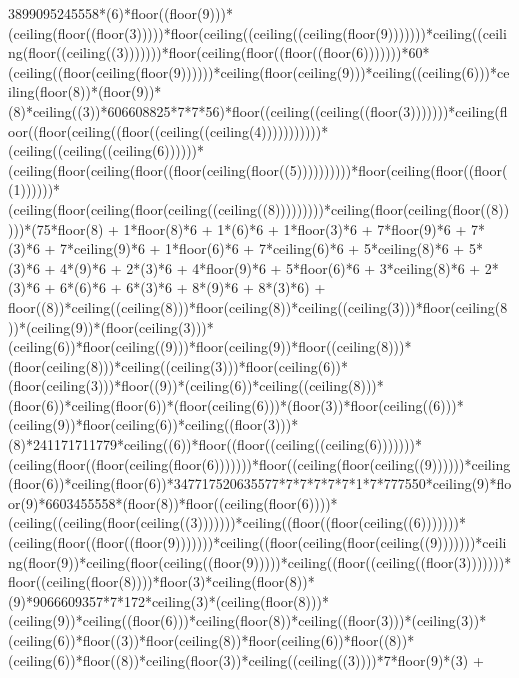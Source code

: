 3899095245558*(6)*floor((floor(9)))*(ceiling(floor((floor(3)))))*floor(ceiling((ceiling((ceiling(floor(9)))))))*ceiling((ceiling(floor((ceiling((3)))))))*floor(ceiling(floor((floor((floor(6)))))))*60*(ceiling((floor(ceiling(floor(9))))))*ceiling(floor(ceiling(9)))*ceiling((ceiling(6)))*ceiling(floor(8))*(floor(9))*(8)*ceiling((3))*606608825*7*7*56)*floor((ceiling((ceiling((floor(3)))))))*ceiling(floor((floor(ceiling((floor((ceiling((ceiling(4)))))))))))*(ceiling((ceiling((ceiling(6))))))*(ceiling(floor(ceiling(floor((floor(ceiling(floor((5))))))))))*floor(ceiling(floor((floor((1))))))*(ceiling(floor(ceiling(floor(ceiling((ceiling((8)))))))))*ceiling(floor(ceiling(floor((8)))))*(75*floor(8) + 1*floor(8)*6 + 1*(6)*6 + 1*floor(3)*6 + 7*floor(9)*6 + 7*(3)*6 + 7*ceiling(9)*6 + 1*floor(6)*6 + 7*ceiling(6)*6 + 5*ceiling(8)*6 + 5*(3)*6 + 4*(9)*6 + 2*(3)*6 + 4*floor(9)*6 + 5*floor(6)*6 + 3*ceiling(8)*6 + 2*(3)*6 + 6*(6)*6 + 6*(3)*6 + 8*(9)*6 + 8*(3)*6) + floor((8))*ceiling((ceiling(8)))*floor(ceiling(8))*ceiling((ceiling(3)))*floor(ceiling(8))*(ceiling(9))*(floor(ceiling(3)))*(ceiling(6))*floor(ceiling((9)))*floor(ceiling(9))*floor((ceiling(8)))*(floor(ceiling(8)))*ceiling((ceiling(3)))*floor(ceiling(6))*(floor(ceiling(3)))*floor((9))*(ceiling(6))*ceiling((ceiling(8)))*(floor(6))*ceiling(floor(6))*(floor(ceiling(6)))*(floor(3))*floor(ceiling((6)))*(ceiling(9))*floor(ceiling(6))*ceiling((floor(3)))*(8)*241171711779*ceiling((6))*floor((floor((ceiling((ceiling(6)))))))*(ceiling(floor((floor(ceiling(floor(6)))))))*floor((ceiling(floor(ceiling((9))))))*ceiling(floor(6))*ceiling(floor(6))*347717520635577*7*7*7*7*7*1*7*777550*ceiling(9)*floor(9)*6603455558*(floor(8))*floor((ceiling(floor(6))))*(ceiling((ceiling(floor(ceiling((3)))))))*ceiling((floor((floor(ceiling((6)))))))*(ceiling(floor((floor((floor(9)))))))*ceiling((floor(ceiling(floor(ceiling((9)))))))*ceiling(floor(9))*ceiling(floor(ceiling((floor(9)))))*ceiling((floor((ceiling((floor(3)))))))*floor((ceiling(floor(8))))*floor(3)*ceiling(floor(8))*(9)*9066609357*7*172*ceiling(3)*(ceiling(floor(8)))*(ceiling(9))*ceiling((floor(6)))*ceiling(floor(8))*ceiling((floor(3)))*(ceiling(3))*(ceiling(6))*floor((3))*floor(ceiling(8))*floor(ceiling(6))*floor((8))*(ceiling(6))*floor((8))*ceiling(floor(3))*ceiling((ceiling((3))))*7*floor(9)*(3) + 